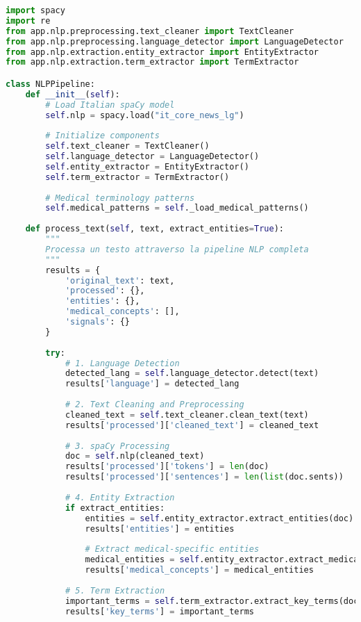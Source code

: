 \documentclass[12pt,a4paper]{report}
\begin{document}
\begin{lstlisting}[language=Python, caption=NLP Processing Pipeline]
import spacy
import re
from app.nlp.preprocessing.text_cleaner import TextCleaner
from app.nlp.preprocessing.language_detector import LanguageDetector
from app.nlp.extraction.entity_extractor import EntityExtractor
from app.nlp.extraction.term_extractor import TermExtractor

class NLPPipeline:
    def __init__(self):
        # Load Italian spaCy model
        self.nlp = spacy.load("it_core_news_lg")
        
        # Initialize components
        self.text_cleaner = TextCleaner()
        self.language_detector = LanguageDetector()
        self.entity_extractor = EntityExtractor()
        self.term_extractor = TermExtractor()
        
        # Medical terminology patterns
        self.medical_patterns = self._load_medical_patterns()
    
    def process_text(self, text, extract_entities=True):
        """
        Processa un testo attraverso la pipeline NLP completa
        """
        results = {
            'original_text': text,
            'processed': {},
            'entities': {},
            'medical_concepts': [],
            'signals': {}
        }
        
        try:
            # 1. Language Detection
            detected_lang = self.language_detector.detect(text)
            results['language'] = detected_lang
            
            # 2. Text Cleaning and Preprocessing
            cleaned_text = self.text_cleaner.clean_text(text)
            results['processed']['cleaned_text'] = cleaned_text
            
            # 3. spaCy Processing
            doc = self.nlp(cleaned_text)
            results['processed']['tokens'] = len(doc)
            results['processed']['sentences'] = len(list(doc.sents))
            
            # 4. Entity Extraction
            if extract_entities:
                entities = self.entity_extractor.extract_entities(doc)
                results['entities'] = entities
                
                # Extract medical-specific entities
                medical_entities = self.entity_extractor.extract_medical_entities(doc)
                results['medical_concepts'] = medical_entities
            
            # 5. Term Extraction
            important_terms = self.term_extractor.extract_key_terms(doc)
            results['key_terms'] = important_terms
            

\end{lstlisting}
\end{document}
